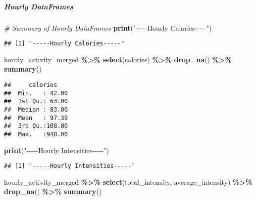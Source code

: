 \documentclass[
]{article}
\newenvironment{Shaded}{\begin{snugshade}}{\end{snugshade}}
\newcommand{\CommentTok}[1]{\textcolor[rgb]{0.56,0.35,0.01}{\textit{#1}}}
\newcommand{\FunctionTok}[1]{\textcolor[rgb]{0.13,0.29,0.53}{\textbf{#1}}}
\newcommand{\NormalTok}[1]{#1}
\newcommand{\SpecialCharTok}[1]{\textcolor[rgb]{0.81,0.36,0.00}{\textbf{#1}}}
\newcommand{\StringTok}[1]{\textcolor[rgb]{0.31,0.60,0.02}{#1}}
\begin{document}
\hypertarget{hourly-dataframes-8}{%
\subparagraph{Hourly DataFrames}\label{hourly-dataframes-8}}

\begin{Shaded}
\begin{Highlighting}[]
\CommentTok{\# Summary of Hourly DataFrames}
\FunctionTok{print}\NormalTok{(}\StringTok{"{-}{-}{-}{-}{-}Hourly Calories{-}{-}{-}{-}{-}"}\NormalTok{)}
\end{Highlighting}
\end{Shaded}

\begin{verbatim}
## [1] "-----Hourly Calories-----"
\end{verbatim}

\begin{Shaded}
\begin{Highlighting}[]
\NormalTok{hourly\_activity\_merged }\SpecialCharTok{\%\textgreater{}\%} 
  \FunctionTok{select}\NormalTok{(calories) }\SpecialCharTok{\%\textgreater{}\%} 
  \FunctionTok{drop\_na}\NormalTok{() }\SpecialCharTok{\%\textgreater{}\%} 
  \FunctionTok{summary}\NormalTok{()}
\end{Highlighting}
\end{Shaded}

\begin{verbatim}
##     calories     
##  Min.   : 42.00  
##  1st Qu.: 63.00  
##  Median : 83.00  
##  Mean   : 97.39  
##  3rd Qu.:108.00  
##  Max.   :948.00
\end{verbatim}

\begin{Shaded}
\begin{Highlighting}[]
\FunctionTok{print}\NormalTok{(}\StringTok{"{-}{-}{-}{-}{-}Hourly Intensities{-}{-}{-}{-}{-}"}\NormalTok{)}
\end{Highlighting}
\end{Shaded}

\begin{verbatim}
## [1] "-----Hourly Intensities-----"
\end{verbatim}

\begin{Shaded}
\begin{Highlighting}[]
\NormalTok{hourly\_activity\_merged }\SpecialCharTok{\%\textgreater{}\%} 
  \FunctionTok{select}\NormalTok{(total\_intensity, average\_intensity) }\SpecialCharTok{\%\textgreater{}\%} 
  \FunctionTok{drop\_na}\NormalTok{() }\SpecialCharTok{\%\textgreater{}\%} 
  \FunctionTok{summary}\NormalTok{()}
\end{Highlighting}
\end{Shaded}
\end{document}

